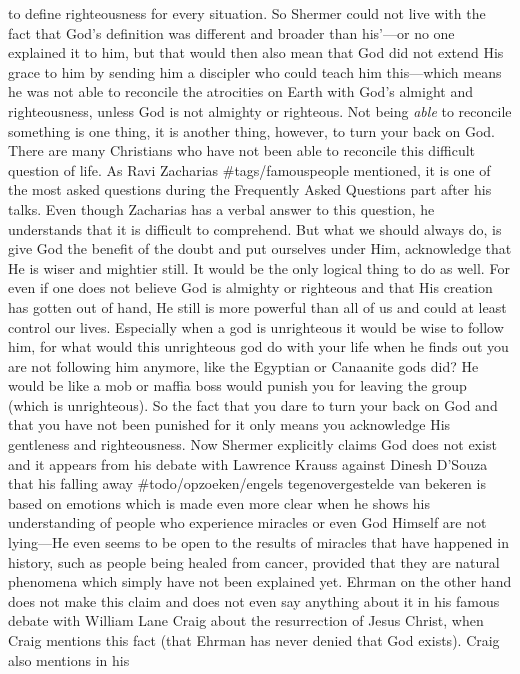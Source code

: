 to define righteousness for every situation. So Shermer could not live
with the fact that God's definition was different and broader than
his'---or no one explained it to him, but that would then also mean that
God did not extend His grace to him by sending him a discipler who could
teach him this---which means he was not able to reconcile the atrocities
on Earth with God's almight and righteousness, unless God is not
almighty or righteous. Not being \emph{able} to reconcile something is
one thing, it is another thing, however, to turn your back on God. There
are many Christians who have not been able to reconcile this difficult
question of life. As Ravi Zacharias \#tags/famouspeople mentioned, it is
one of the most asked questions during the Frequently Asked Questions
part after his talks. Even though Zacharias has a verbal answer to this
question, he understands that it is difficult to comprehend. But what we
should always do, is give God the benefit of the doubt and put ourselves
under Him, acknowledge that He is wiser and mightier still. It would be
the only logical thing to do as well. For even if one does not believe
God is almighty or righteous and that His creation has gotten out of
hand, He still is more powerful than all of us and could at least
control our lives. Especially when a god is unrighteous it would be wise
to follow him, for what would this unrighteous god do with your life
when he finds out you are not following him anymore, like the Egyptian
or Canaanite gods did? He would be like a mob or maffia boss would
punish you for leaving the group (which is unrighteous). So the fact
that you dare to turn your back on God and that you have not been
punished for it only means you acknowledge His gentleness and
righteousness. Now Shermer explicitly claims God does not exist and it
appears from his debate with Lawrence Krauss against Dinesh D'Souza that
his falling away \#todo/opzoeken/engels tegenovergestelde van bekeren is
based on emotions which is made even more clear when he shows his
understanding of people who experience miracles or even God Himself are
not lying---He even seems to be open to the results of miracles that
have happened in history, such as people being healed from cancer,
provided that they are natural phenomena which simply have not been
explained yet. Ehrman on the other hand does not make this claim and
does not even say anything about it in his famous debate with William
Lane Craig about the resurrection of Jesus Christ, when Craig mentions
this fact (that Ehrman has never denied that God exists). Craig also
mentions in his
